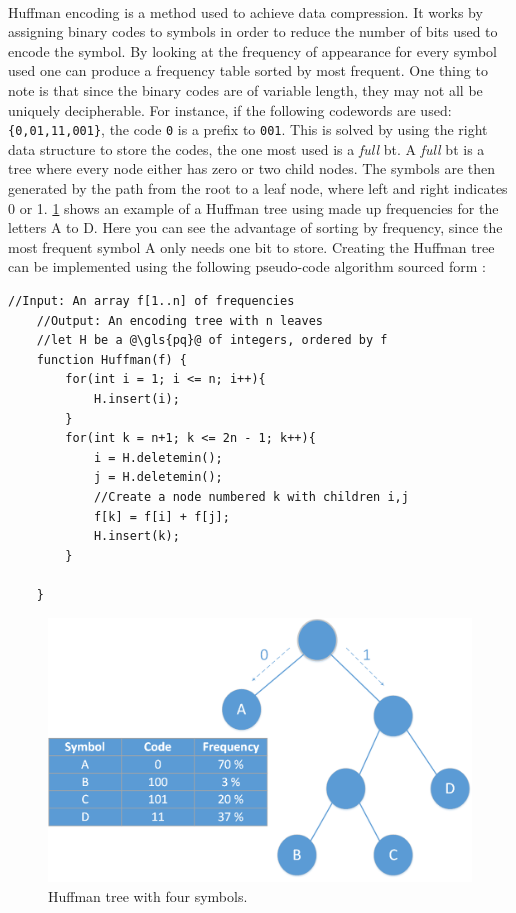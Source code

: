 \documentclass[a4paper, 12pt]{report}
\newcommand{\codeword}[1]{\texttt{#1}}
\begin{document}
\paragraph{}
Huffman encoding is a method used to achieve data compression\cite{huffman}.
It works by assigning binary codes to symbols in order to reduce the number of bits used to encode the symbol.
By looking at the frequency of appearance for every symbol used one can produce a frequency table sorted by most frequent.
One thing to note is that since the binary codes are of variable length, they may not all be uniquely decipherable.
For instance, if the following codewords are used: \codeword{\{0,01,11,001\}}, the code \codeword{0} is a prefix to \codeword{001}.
This is solved by using the right data structure to store the codes, the one most used is a \textit{full} \gls{bt}.
A \textit{full} \gls{bt} is a tree where every node either has zero or two child nodes.
The symbols are then generated by the path from the root to a leaf node, where left and right indicates 0 or 1.
\ref{fig:hm-ex} shows an example of a Huffman tree using made up frequencies for the letters A to D.
Here you can see the advantage of sorting by frequency, since the most frequent symbol A only needs one bit to store.
Creating the Huffman tree can be implemented using the following pseudo-code algorithm sourced form \cite{algorithms}:

\begin{lstlisting}[caption=Huffman algorithm., label=lst:huffman]
	//Input: An array f[1..n] of frequencies
	//Output: An encoding tree with n leaves
	//let H be a @\gls{pq}@ of integers, ordered by f
	function Huffman(f) {
		for(int i = 1; i <= n; i++){
			H.insert(i);
		}
		for(int k = n+1; k <= 2n - 1; k++){
			i = H.deletemin();
			j = H.deletemin();
			//Create a node numbered k with children i,j
			f[k] = f[i] + f[j];
			H.insert(k);
		}

	}
\end{lstlisting}

\begin{figure}[h!]
	\centering
		\includegraphics[width=1.0\textwidth]{images/huffman.png}
		\caption{Huffman tree with four symbols.}
		\label{fig:hm-ex}
\end{figure}
\end{document}
